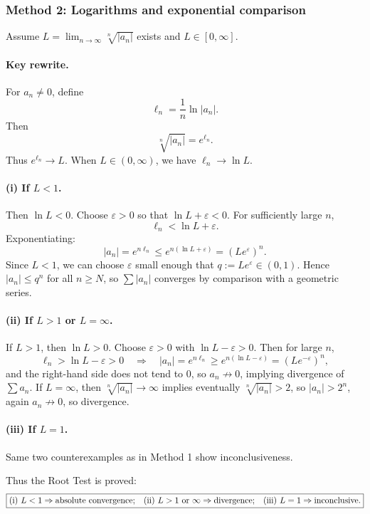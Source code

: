 \documentclass[12pt]{article}
\begin{document}
\newpage
\subsubsection*{Method 2: Logarithms and exponential comparison}
Assume \(L=\lim_{n\to\infty}\sqrt[n]{|a_n|}\) exists and \(L\in[0,\infty]\).

\paragraph{Key rewrite.}
For \(a_n\neq 0\), define
\[
\ell_n=\frac{1}{n}\ln|a_n|.
\]
Then
\[
\sqrt[n]{|a_n|}=e^{\ell_n}.
\]
Thus \(e^{\ell_n}\to L\). When \(L\in(0,\infty)\), we have \(\ell_n\to \ln L\).

\paragraph{(i) If \(L<1\).}
Then \(\ln L<0\). Choose \(\varepsilon>0\) so that \(\ln L+\varepsilon<0\).
For sufficiently large \(n\),
\[
\ell_n<\ln L+\varepsilon.
\]
Exponentiating:
\[
|a_n|=e^{n\ell_n}\le e^{n(\ln L+\varepsilon)}=(Le^\varepsilon)^n.
\]
Since \(L<1\), we can choose \(\varepsilon\) small enough that \(q:=Le^\varepsilon\in(0,1)\).
Hence \(|a_n|\le q^n\) for all \(n\ge N\), so \(\sum |a_n|\) converges by comparison with a geometric series.

\paragraph{(ii) If \(L>1\) or \(L=\infty\).}
If \(L>1\), then \(\ln L>0\). Choose \(\varepsilon>0\) with \(\ln L-\varepsilon>0\). Then for large \(n\),
\[
\ell_n>\ln L-\varepsilon>0 \quad\Rightarrow\quad |a_n|=e^{n\ell_n}\ge e^{n(\ln L-\varepsilon)}=(Le^{-\varepsilon})^n,
\]
and the right-hand side does not tend to \(0\), so \(a_n\not\to 0\), implying divergence of \(\sum a_n\).
If \(L=\infty\), then \(\sqrt[n]{|a_n|}\to\infty\) implies eventually \(\sqrt[n]{|a_n|}>2\), so \(|a_n|>2^n\), again \(a_n\not\to 0\), so divergence.

\paragraph{(iii) If \(L=1\).}
Same two counterexamples as in Method 1 show inconclusiveness.

Thus the Root Test is proved:
\[
\boxed{\text{(i) }L<1\Rightarrow \text{absolute convergence;\quad (ii) }L>1 \text{ or } \infty \Rightarrow \text{divergence;\quad (iii) }L=1\Rightarrow \text{inconclusive.}}
\]
\end{document}

